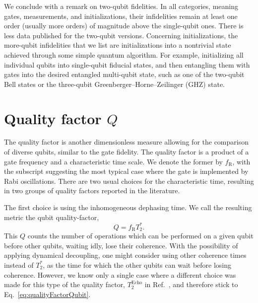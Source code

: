 \documentclass[aps, prx, showpacs, twocolumn, superscriptaddress, notitlepage, longbibliography, floatfix, nofootinbib]{revtex4-2}
\newcommand{\TEcho}{T_2^\mathrm{Echo}}
\newcommand{\recheck}[1]{{#1}}
\begin{document}
We conclude with a remark on two-qubit fidelities. \recheck{In all categories, meaning gates, measurements, and initializations, their infidelities remain at least one order (usually more orders) of magnitude above the single-qubit ones. There is less data published for the two-qubit versions.} \recheck{Concerning initializations, the more-qubit infidelities that we list are initializations into a nontrivial state achieved through some simple quantum algorithm.} For example, initializing all individual qubits into single-qubit fiducial states, and then entangling them with gates into the desired entangled multi-qubit state, such as one of the two-qubit Bell states or the three-qubit Greenberger–Horne–Zeilinger (GHZ) state. 


\section{Quality factor \texorpdfstring{$Q$}{Q}}

\label{sec:qualityFactor}

The quality factor is another dimensionless measure allowing for the comparison of diverse qubits, similar to the gate fidelity. The quality factor is a product of a gate frequency and a characteristic time scale. We denote the former by $f_\mathrm{R}$, with the subscript suggesting the most typical case where the gate is implemented by Rabi oscillations. There are two usual choices for the characteristic time, resulting in two groups of quality factors reported in the literature. 

The first choice is using the inhomogeneous dephasing time. We call the resulting metric the qubit quality-factor,
\begin{equation}
Q = f_\mathrm{R} T_2^*.
\label{eq:qualityFactorQubit}
\end{equation}
This $Q$ counts the number of operations which can be performed on a given qubit before other qubits, waiting idly, lose their coherence. With the possibility of applying dynamical decoupling, one might consider using other coherence times instead of $T_2^*$, as the time for which the other qubits can wait before losing coherence. However, we know only a single case where a different choice was made for this type of the quality factor, $ \TEcho$ in Ref.~\cite{dial_charge_2013}, and therefore stick to Eq.~\eqref{eq:qualityFactorQubit}. 
\end{document}
